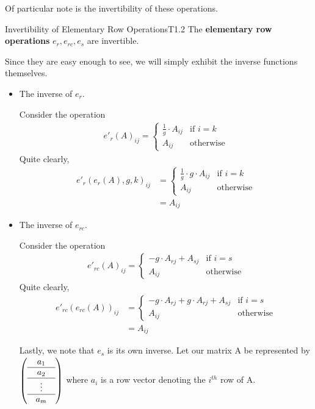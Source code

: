 \documentclass[oneside]{book}
\begin{document}
	Of particular note is the invertibility of these operations.
	\begin{theo}{Invertibility of Elementary Row Operations}{T1.2}
		The \textbf{elementary row operations} $e_r, e_{rc}, e_s$ are invertible.
	\end{theo}
	\begin{pr}
		\begin{sk}
			Since they are easy enough to see, we will simply exhibit the inverse functions themselves.
		\end{sk}
		\begin{itemize}
		\item The inverse of $e_r$.
		
		Consider the operation 
		\begin{align*}
			e'_r(A)_{ij} =\begin{cases}
				\frac{1}{g} \cdot A_{ij} & \text{if } i = k \\
				A_{ij} & \text{otherwise}
			\end{cases}
		\end{align*}
		Quite clearly, 
		\begin{align*}
			e'_r(e_r(A), g, k)_{ij} &=\begin{cases}
				\frac{1}{g} \cdot g \cdot A_{ij} & \text{if } i = k \\
				A_{ij} & \text{otherwise}
			\end{cases}\\
		&= A_{ij}
		\end{align*}
	
		\item The inverse of $e_{rc}$.
		
		Consider the operation
		\begin{align*}
			e'_{rc}(A)_{ij} =\begin{cases}
				-g \cdot A_{rj} + A_{sj} & \text{if } i = s \\
				A_{ij} & \text{otherwise}
			\end{cases}
		\end{align*}
		Quite clearly, 
		\begin{align*}
		e'_{rc}(e_{rc}(A))_{ij} &=\begin{cases}
			-g \cdot A_{rj} + g \cdot A_{rj} + A_{sj} & \text{if } i = s \\
			A_{ij} & \text{otherwise}
		\end{cases} \\
		&= A_{ij}
		\end{align*}
	
		Lastly, we note that $e_s$ is its own inverse. Let our matrix A be represented by $\left(\begin{array}{@{}ccc@{}}
			& a_{1} & \\ \hline
			& a_{2} & \\ \hline
			& \vdots & \\ \hline
			& a_{m} & \\
		\end{array}\right)$ where $a_{i}$ is a row vector denoting the $i^{th}$ row of A. 
		

\end{itemize}
\end{pr}
\end{document}
